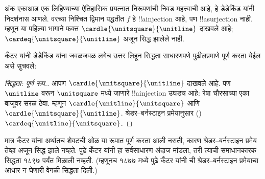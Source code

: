 \documentclass[../../../include/open-logic-section]{subfiles}
\begin{document}
अंक एकाआड एक लिहिण्याच्या ऐतिहासिक प्रयत्नात
निरूपणांची निवड महत्त्वाची आहे, हे डेडेकिंड यांनी
निदर्शनास आणले. वरच्या निश्चित द्विमान पद्धतीत $f$
हे !!a{injection} आहे, पण !!a{surjection} नाही.
म्हणून या पहिल्या भागाने फक्त
$\cardle{\unitsquare}{\unitline}$ दाखवले आहे;
$\cardeq{\unitsquare}{\unitline}$ अजून सिद्ध झालेले नाही.

कँटर यांनी डेडेकिंड यांना जवळजवळ लगेच उत्तर लिहून सिद्धता साधारणपणे पुढीलप्रमाणे पूर्ण करता येईल असे सुचवले:

\begin{proof}[सिद्धता: पूर्ण रूप.]
आपण $\cardle{\unitsquare}{\unitline}$ दाखवले आहे. पण $\unitline$ वरून $\unitsquare$ मध्ये जाणारे !!a{injection} उघडच आहे: रेषा चौरसाच्या एका बाजूवर सरळ ठेवा. म्हणून $\cardle{\unitline}{\unitsquare}$ आणि $\cardle{\unitsquare}{\unitline}$. श्रेडर--बर्नस्टाइन प्रमेयानुसार () $\cardeq{\unitline}{\unitsquare}$.
\end{proof}

मात्र कँटर यांना अर्थातच शेवटची ओळ या रूपात पूर्ण करता आली नसती, कारण श्रेडर--बर्नस्टाइन प्रमेय तेव्हा अजून सिद्ध झाले नव्हते. पुढे कँटर यांनी हा सर्वसाधारण अंदाज मांडला, तरी त्याची समाधानकारक सिद्धता १८९७ पर्यंत मिळाली नव्हती. (म्हणूनच १८७७ मध्ये पुढे कँटर यांनी  ची श्रेडर--बर्नस्टाइन प्रमेयाचा आधार न घेणारी वेगळी सिद्धता दिली.)
\end{document}
